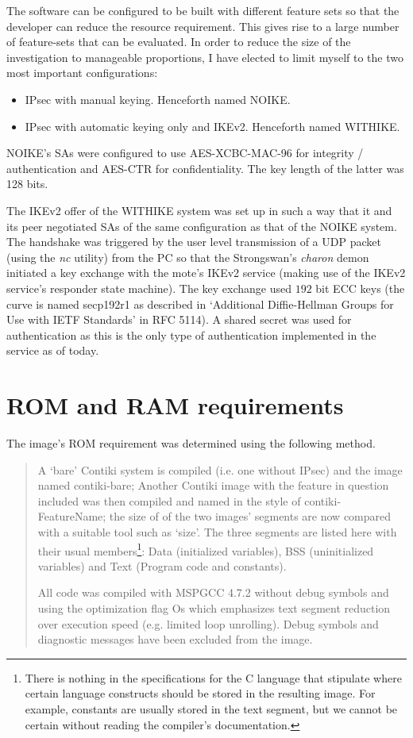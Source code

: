 \documentclass[final,a4paper,twoside,11pt,onecolumn]{report}
\begin{document}
The software can be configured to be built with different feature sets so that the developer can reduce the resource requirement. This gives rise to a large number of feature-sets that can be evaluated. In order to reduce the size of the investigation to manageable proportions, I have elected to limit myself to the two most important configurations:

\begin{itemize}
   \item IPsec with manual keying. Henceforth named NOIKE.
   \item IPsec with automatic keying only and IKEv2. Henceforth named WITHIKE.
\end{itemize}

NOIKE's SAs were configured to use AES-XCBC-MAC-96\cite{rfc3566} for integrity / authentication and AES-CTR\cite{rfc3686} for confidentiality. The key length of the latter was 128 bits.

The IKEv2 offer of the WITHIKE system was set up in such a way that it and its peer negotiated SAs of the same configuration as that of the NOIKE system. The handshake was triggered by the user level transmission of a UDP packet (using the \emph{nc} utility) from the PC so that the Strongswan's \emph{charon} demon initiated a key exchange with the mote's IKEv2 service (making use of the IKEv2 service's responder state machine). The key exchange used $192$ bit ECC keys (the curve is named secp192r1 as described in `Additional Diffie-Hellman Groups for Use with IETF Standards' in RFC 5114\cite{rfc5114}). A shared secret was used for authentication as this is the only type of authentication implemented in the service as of today.

\section{ROM and RAM requirements}
\label{imagecomp}
The image's ROM requirement was determined using the following method.

\begin{quotation}
A `bare' Contiki system is compiled (i.e. one without IPsec) and the image named contiki-bare; Another Contiki image with the feature in question included was then compiled and named in the style of contiki-FeatureName; the size of of the two images' segments are now compared with a suitable tool such as `size'. The three segments are listed here with their usual members\footnote{There is nothing in the specifications for the C language that stipulate where certain language constructs should be stored in the resulting image. For example, constants are usually stored in the text segment, but we cannot be certain without reading the compiler's documentation.}: Data (initialized variables), BSS (uninitialized variables) and Text (Program code and constants).

All code was compiled with MSPGCC 4.7.2 without debug symbols and using the optimization flag Os which emphasizes text segment reduction over execution speed (e.g. limited loop unrolling). Debug symbols and diagnostic messages have been excluded from the image.
\end{quotation}
\end{document}
